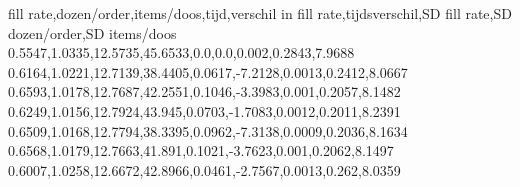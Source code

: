 fill rate,dozen/order,items/doos,tijd,verschil in fill rate,tijdsverschil,SD fill rate,SD dozen/order,SD items/doos
0.5547,1.0335,12.5735,45.6533,0.0,0.0,0.002,0.2843,7.9688
0.6164,1.0221,12.7139,38.4405,0.0617,-7.2128,0.0013,0.2412,8.0667
0.6593,1.0178,12.7687,42.2551,0.1046,-3.3983,0.001,0.2057,8.1482
0.6249,1.0156,12.7924,43.945,0.0703,-1.7083,0.0012,0.2011,8.2391
0.6509,1.0168,12.7794,38.3395,0.0962,-7.3138,0.0009,0.2036,8.1634
0.6568,1.0179,12.7663,41.891,0.1021,-3.7623,0.001,0.2062,8.1497
0.6007,1.0258,12.6672,42.8966,0.0461,-2.7567,0.0013,0.262,8.0359
